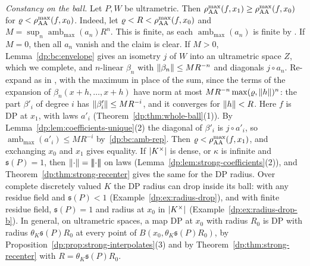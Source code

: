 \begin{remark}
\emph{Constancy on the ball.} Let $P,W$ be ultrametric. Then $\rho^{\max}_{\rm AA}(f,x_1)\ge\rho^{\max}_{\rm AA}(f,x_0)$ for $\varrho<\rho^{\max}_{\rm AA}(f,x_0)$. Indeed, let $\varrho<R<\rho^{\max}_{\rm AA}(f,x_0)$ and $M=\sup_n\operatorname{amb}_{\max}(a_n)R^n$. This is finite, as each $\operatorname{amb}_{\max}(a_n)$ is finite by \cite[Theorem~14.39(1), (14.9)]{I}. If $M=0$, then all $a_n$ vanish and the claim is clear. If $M>0$, Lemma~\ref{dp:bc:envelope} gives an isometry $j$ of $W$ into an ultrametric space $Z$, which we complete, and $n$\nobreakdash-linear $\beta_n$ with $\lVert \beta_n\rVert\le MR^{-n}$ and diagonals $j\circ a_n$. Re-expand as in \cite[Proposition~14.12(2)]{I}, with the maximum in place of the sum, since the terms of the expansion of $\beta_n(x+h,\dots,x+h)$ have norm at most $MR^{-n}\max(\varrho,\lVert h\rVert)^n$: the part $\beta'_i$ of degree $i$ has $\lVert \beta'_i\rVert\le MR^{-i}$, and it converges for $\lVert h\rVert<R$. Here $f$ is DP at $x_1$, with laws $a'_i$ (Theorem~\ref{dp:thm:whole-ball}(1)). By Lemma~\ref{dp:lem:coefficients-unique}(2) the diagonal of $\beta'_i$ is $j\circ a'_i$, so $\operatorname{amb}_{\max}(a'_i)\le MR^{-i}$ by~\eqref{dp:bc:amb-rep}. Then $\varrho<\rho^{\max}_{\rm AA}(f,x_1)$, and exchanging $x_0$ and $x_1$ gives equality. If $\lvert K^\times\rvert$ is dense, or $\kappa$ is infinite and $\mathfrak s(P)=1$, then $\lVert \cdot\rVert=\lvert\!\lvert\!\lvert \cdot\rvert\!\rvert\!\rvert$ on laws (Lemma~\ref{dp:lem:strong-coefficients}(2)), and Theorem~\ref{dp:thm:strong-recenter} gives the same for the DP radius. Over complete discretely valued $K$ the DP radius can drop inside its ball: with any residue field and $\mathfrak s(P)<1$ (Example~\ref{dp:ex:radius-drop}), and with finite residue field, $\mathfrak s(P)=1$ and radius at $x_0$ in $\lvert K^\times\rvert$ (Example~\ref{dp:ex:radius-drop-b}). In general, on ultrametric spaces, a map DP at $x_0$ with radius $R_0$ is DP with radius $\theta_K\mathfrak s(P)R_0$ at every point of $B(x_0,\theta_K\mathfrak s(P)R_0)$, by Proposition~\ref{dp:prop:strong-interpolates}(3) and by Theorem~\ref{dp:thm:strong-recenter} with $R=\theta_K\mathfrak s(P)R_0$.
\end{remark}
